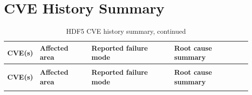 \documentclass[../main.tex]{subfiles}
\begin{document}
\section{CVE History Summary}
\label{app:cve-history-summary}

\begingroup
\scriptsize
\setlength{\tabcolsep}{2pt}
\renewcommand{\arraystretch}{1.15}

\setlength{\LTleft}{-0.7in}
\setlength{\LTright}{-0.7in}

\begin{longtable}{@{}p{0.15\widetablewidth}p{0.20\widetablewidth}p{0.20\widetablewidth}p{0.44\widetablewidth}@{}}
\caption{HDF5 CVE history summary}
\label{tab:cve-history-summary}\\
\hline
\textbf{CVE(s)} & \textbf{Affected area} & \textbf{Reported failure mode} & \textbf{Root cause summary} \\
\hline
\endfirsthead

\caption[]{HDF5 CVE history summary, continued}\\
\hline
\textbf{CVE(s)} & \textbf{Affected area} & \textbf{Reported failure mode} & \textbf{Root cause summary} \\
\hline
\endhead

\hline
\endfoot

\hline
\endlastfoot


\end{longtable}
\end{document}
